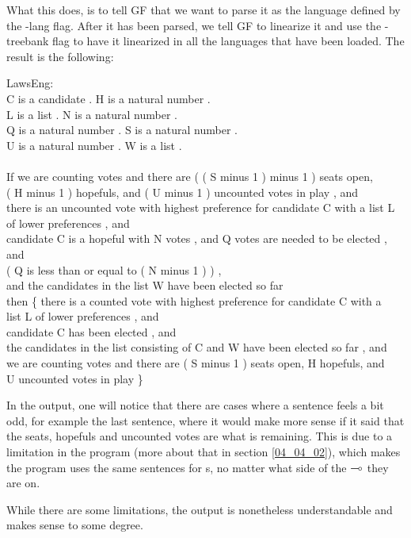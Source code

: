 What this does, is to tell GF that we want to parse it as the language defined by the -lang flag. After it has been parsed, we tell GF to linearize it  and use the -treebank flag to have it linearized in all the languages that have been loaded. The result is the following:

\begin{texto2}
LawsEng: \\
C is a candidate . H is a natural number . \\
L is a list . N is a natural number . \\
Q is a natural number . S is a natural number . \\
U is a natural number . W is a list .\\\\
If we are counting votes and there are ( ( S minus 1 ) minus 1 ) seats open, \\
( H minus 1 ) hopefuls, and ( U minus 1 ) uncounted votes in play , and \\
there is an uncounted vote with highest preference for candidate C with a list L \\
of lower preferences , and \\
candidate C is a hopeful with N votes , and Q votes are needed to be elected , and \\
( Q is less than or equal to ( N minus 1 ) ) , \\
and the candidates in the list W have been elected so far \\
then \{ there is a counted vote with highest preference for candidate C with a \\
list L of lower preferences , and \\
candidate C has been elected , and \\
the candidates in the list consisting of C and W have been elected so far , and \\
we are counting votes and there are ( S minus 1 ) seats open, H hopefuls, and \\
U uncounted votes in play \}
\end{texto2}

In the output, one will notice that there are cases where a sentence feels a bit odd, for example the last sentence, where it would make more sense if it said that the seats, hopefuls and uncounted votes are what is remaining. This is due to a limitation in the program (more about that in section \ref{04_04_02}), which makes the program uses the same sentences for s, no matter what side of the $\multimap$ they are on.

While there are some limitations, the output is nonetheless understandable and makes sense to some degree.
